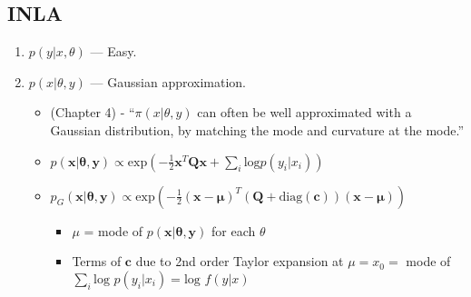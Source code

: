 \documentclass{article}
\begin{document}
\subsection*{INLA}
\begin{enumerate}

\item $p(y|x,\theta)$ --- Easy.

\item $p(x|\theta, y)$ --- Gaussian approximation. \\

\citep{Rue2005}
      \begin{itemize}
      \item  (Chapter 4) - ``$\pi(x|\theta,y)$ can often be well approximated with a Gaussian distribution, by matching the mode and curvature at the mode.''
      \end{itemize}

\citep{Rue2007}
      \begin{itemize}
      \item $p(\pmb{x}|\pmb{\theta},\pmb{y}) \propto \text{exp}\left(-\frac{1}{2}\pmb{x}^{T}\pmb{Qx} + \sum_{i} \text{log}p(y_{i}|x_{i}) \right)$
      \item $p_{G}(\pmb{x}|\pmb{\theta},\pmb{y}) \propto \text{exp} \left( -\frac{1}{2}(\pmb{x-\mu})^{T} (\pmb{Q} + \text{diag}(\pmb{c}) ) (\pmb{x - \mu}) \right)$
                \begin{itemize}
                \item $\mu$ = mode of $p(\pmb{x}|\pmb{\theta, y})$ for each $\theta$ \citep{Rue2007}
                \item Terms of $\pmb{c}$ due to 2nd order Taylor expansion at $\mu = x_{0} =$ mode of $\sum_{i} \text{log }p(y_{i}|x_{i}) = \text{log }f(y|x)$
                \end{itemize}
      \end{itemize}


\end{enumerate}
\end{document}
